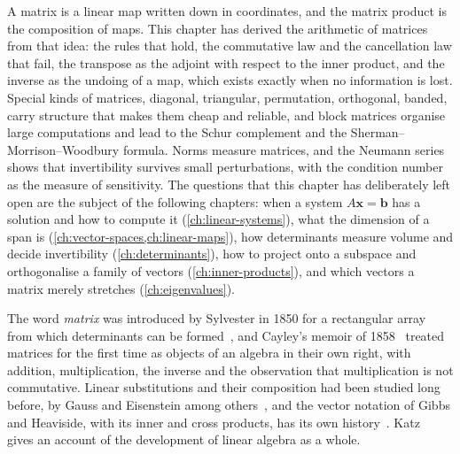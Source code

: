 \bigskip
A matrix is a linear map written down in coordinates, and the matrix product is the composition of maps. This chapter has derived the arithmetic of matrices from that idea: the rules that hold, the commutative law and the cancellation law that fail, the transpose as the adjoint with respect to the inner product, and the inverse as the undoing of a map, which exists exactly when no information is lost. Special kinds of matrices, diagonal, triangular, permutation, orthogonal, banded, carry structure that makes them cheap and reliable, and block matrices organise large computations and lead to the Schur complement and the Sherman--Morrison--Woodbury formula. Norms measure matrices, and the Neumann series shows that invertibility survives small perturbations, with the condition number as the measure of sensitivity. The questions that this chapter has deliberately left open are the subject of the following chapters: when a system $A\mathbf x=\mathbf b$ has a solution and how to compute it (\cref{ch:linear-systems}), what the dimension of a span is (\cref{ch:vector-spaces,ch:linear-maps}), how determinants measure volume and decide invertibility (\cref{ch:determinants}), how to project onto a subspace and orthogonalise a family of vectors (\cref{ch:inner-products}), and which vectors a matrix merely stretches (\cref{ch:eigenvalues}).

\chapternotes

The word \emph{matrix} was introduced by Sylvester in 1850 for a rectangular array from which determinants can be formed~\cite{sylvester1850}, and Cayley's memoir of 1858~\cite{cayley1858} treated matrices for the first time as objects of an algebra in their own right, with addition, multiplication, the inverse and the observation that multiplication is not commutative. Linear substitutions and their composition had been studied long before, by Gauss and Eisenstein among others~\cite{katz2009}, and the vector notation of Gibbs and Heaviside, with its inner and cross products, has its own history~\cite{crowe1967}. Katz~\cite{katz2009} gives an account of the development of linear algebra as a whole.

